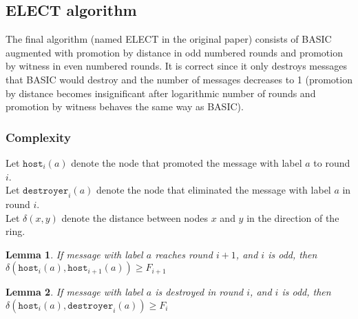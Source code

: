 \documentclass{article}
\newtheorem{lemma}{Lemma}
\begin{document}
\subsection*{ELECT algorithm}
The final algorithm (named ELECT in the original paper) consists of BASIC augmented with promotion by distance in odd numbered rounds and promotion by witness in even numbered rounds. It is correct since it only destroys messages that BASIC would destroy and the number of messages decreases to 1 (promotion by distance becomes insignificant after logarithmic number of rounds and promotion by witness behaves the same way as BASIC).

\subsubsection*{Complexity}
Let $\texttt{host}_i(a)$ denote the node that promoted the message with label $a$ to round $i$. \\
Let $\texttt{destroyer}_i(a)$ denote the node that eliminated the message with label $a$ in round $i$. \\
Let $\delta(x,y)$ denote the distance between nodes $x$ and $y$ in the direction of the ring.

\begin{lemma}
    If message with label $a$ reaches round $i+1$, and  $i$ is odd, then $\delta(\texttt{host}_i(a), \texttt{host}_{i+1}(a)) \geq F_{i+1}$
\end{lemma}

\begin{lemma}
    If message with label $a$ is destroyed in round $i$, and  $i$ is odd, then $\delta(\texttt{host}_i(a), \texttt{destroyer}_{i}(a)) \geq F_{i}$
\end{lemma}
\end{document}
